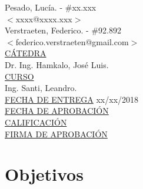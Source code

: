 \begin{titlepage}
\begin{tabbing}
    Pesado, Lucía.	\>\>- \#xx.xxx\\
    \>\footnotesize{$<$xxxx@xxxx.xxx$>$}\\

		Verstraeten, Federico.	\>\>- \#92.892\\
		\>\footnotesize{$<$federico.verstraeten@gmail.com$>$}\\

		\<\underline{CÁTEDRA}\\[0.2cm]
		Dr. Ing. Hamkalo, José Luis. \\

		\<\underline{CURSO}\\[0.2cm]
		Ing. Santi, Leandro. \\[1cm]

		\<\underline{FECHA DE ENTREGA}\>\>\> xx/xx/2018
		\\[0.2cm]

		\<\underline{FECHA DE APROBACIÓN}\>\>\>
		\\[0.2cm]

		\<\underline{CALIFICACIÓN}\>\>\>
		\\[0.2cm]

		\<\underline{FIRMA DE APROBACIÓN}
		\\[0.5cm]

	\end{tabbing}




\end{titlepage}

\clearpage

\tableofcontents

\clearpage



\section{Objetivos}

